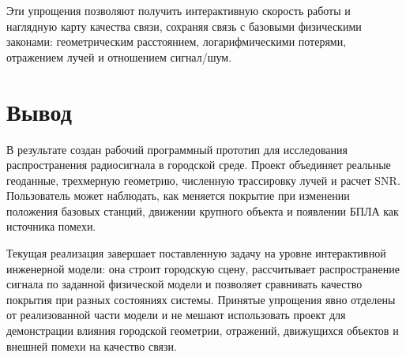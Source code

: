 \documentclass[12pt,a4paper]{article}
\begin{document}
Эти упрощения позволяют получить интерактивную скорость работы и наглядную карту качества связи, сохраняя связь с базовыми физическими законами: геометрическим расстоянием, логарифмическими потерями, отражением лучей и отношением сигнал/шум.

\section{Вывод}

В результате создан рабочий программный прототип для исследования распространения радиосигнала в городской среде. Проект объединяет реальные геоданные, трехмерную геометрию, численную трассировку лучей и расчет SNR. Пользователь может наблюдать, как меняется покрытие при изменении положения базовых станций, движении крупного объекта и появлении БПЛА как источника помехи.

Текущая реализация завершает поставленную задачу на уровне интерактивной инженерной модели: она строит городскую сцену, рассчитывает распространение сигнала по заданной физической модели и позволяет сравнивать качество покрытия при разных состояниях системы. Принятые упрощения явно отделены от реализованной части модели и не мешают использовать проект для демонстрации влияния городской геометрии, отражений, движущихся объектов и внешней помехи на качество связи.
\end{document}
